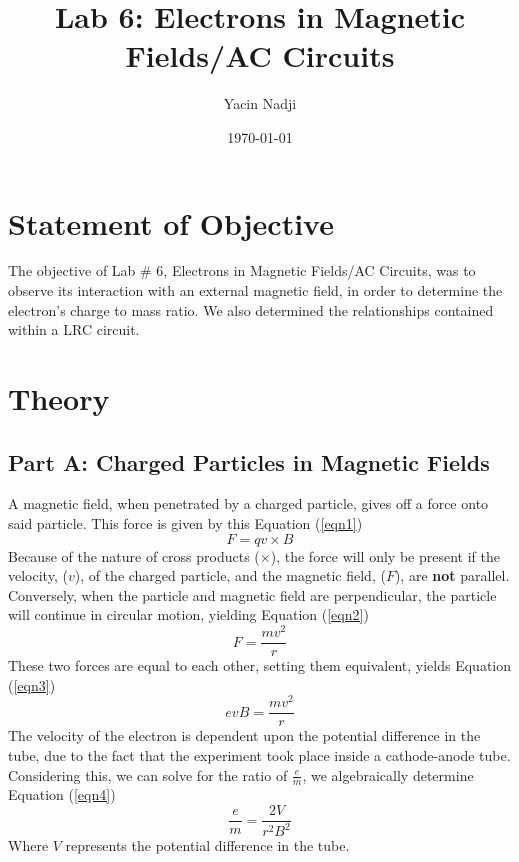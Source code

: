 \documentclass[titlepage]{article}
\title{Lab 6: Electrons in Magnetic Fields/AC Circuits}
\author{Yacin Nadji}
\date{\today}
\begin{document}
\maketitle

\section{Statement of Objective}\label{sec:obj}
The objective of Lab \# 6, Electrons in Magnetic Fields/AC Circuits, was to observe its interaction with an external magnetic field, in order to determine the electron's charge to mass ratio. We also determined the relationships contained within a LRC circuit.

\section{Theory}\label{sec:theory}
\subsection{Part A: Charged Particles in Magnetic Fields}\label{sub:part_a_charged_particles_in_magnetic_fields-th}
A magnetic field, when penetrated by a charged particle, gives off a force onto said particle. This force is given by this Equation (\ref{eqn1})
\begin{equation}\label{eqn1}
	F = qv \times B
\end{equation}
Because of the nature of cross products ($\times$), the force will only be present if the velocity, ($v$), of the charged particle, and the magnetic field, ($F$), are \textbf{not} parallel. Conversely, when the particle and magnetic field are perpendicular, the particle will continue in circular motion, yielding Equation (\ref{eqn2})
\begin{equation}\label{eqn2}
	F = \frac{mv^2}{r}
\end{equation}
These two forces are equal to each other, setting them equivalent, yields Equation (\ref{eqn3})
\begin{equation}\label{eqn3}
	evB = \frac{mv^2}{r}
\end{equation}
The velocity of the electron is dependent upon the potential difference in the tube, due to the fact that the experiment took place inside a cathode-anode tube. Considering this, we can solve for the ratio of $\frac{e}{m}$, we algebraically determine Equation (\ref{eqn4})
\begin{equation}\label{eqn4}
	\frac{e}{m} = \frac{2V}{r^2 B^2}
\end{equation}
Where $V$ represents the potential difference in the tube.
\end{document}
